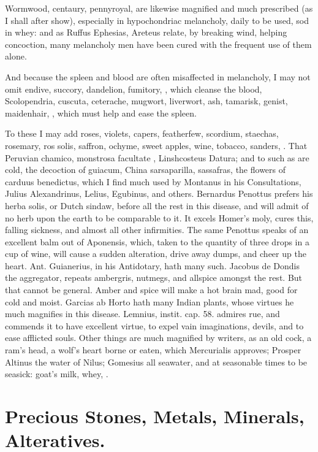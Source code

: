 {Wormwood, centaury, pennyroyal, are likewise magnified and much
prescribed (as I shall after show), especially in hypochondriac
melancholy, daily to be used, sod in whey: and as Ruffus Ephesias,
Areteus relate, by breaking wind, helping concoction, many
melancholy men have been cured with the frequent use of them alone.

And because the spleen and blood are often misaffected in melancholy, I
may not omit endive, succory, dandelion, fumitory, \etc{}, which cleanse
the blood, Scolopendria, cuscuta, ceterache, mugwort, liverwort, ash,
tamarisk, genist, maidenhair, \etc{}, which must help and ease the spleen.

To these I may add roses, violets, capers, featherfew, scordium,
staechas, rosemary, ros solis, saffron, ochyme, sweet apples, wine,
tobacco, sanders, \etc{}. That Peruvian chamico, monstrosa facultate \etc{},
Linshcosteus Datura; and to such as are cold, the decoction of
guiacum, China sarsaparilla, sassafras, the flowers of carduus
benedictus, which I find much used by Montanus in his Consultations,
Julius Alexandrinus, Lelius, Egubinus, and others. Bernardus
Penottus prefers his herba solis, or Dutch sindaw, before all the rest
in this disease, and will admit of no herb upon the earth to be
comparable to it. It excels Homer's moly, cures this, falling sickness,
and almost all other infirmities. The same Penottus speaks of an
excellent balm out of Aponensis, which, taken to the quantity of three
drops in a cup of wine, will cause a sudden alteration, drive
away dumps, and cheer up the heart. Ant. Guianerius, in his Antidotary,
hath many such. Jacobus de Dondis the aggregator, repeats
ambergris, nutmegs, and allspice amongst the rest. But that cannot be
general. Amber and spice will make a hot brain mad, good for cold and
moist. Garcias ab Horto hath many Indian plants, whose virtues he much
magnifies in this disease. Lemnius, instit. cap. 58. admires rue, and
commends it to have excellent virtue, to expel vain imaginations,
devils, and to ease afflicted souls. Other things are much magnified
by writers, as an old cock, a ram's head, a wolf's heart borne or
eaten, which Mercurialis approves; Prosper Altinus the water of Nilus;
Gomesius all seawater, and at seasonable times to be seasick: goat's
milk, whey, \etc{}.

\section{Precious Stones, Metals, Minerals, Alteratives.}

}
